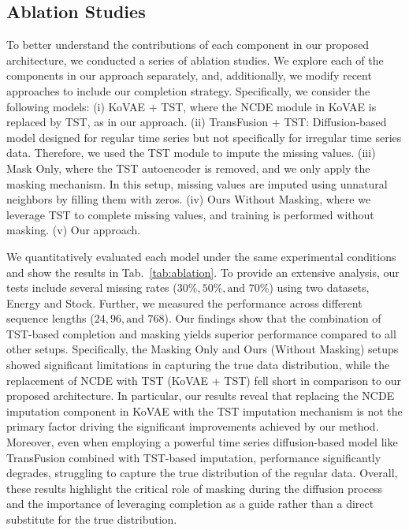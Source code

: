 \documentclass{article}
\theoremstyle{plain}
\theoremstyle{definition}
\theoremstyle{remark}
\begin{document}
\vspace{-2mm}
\subsection{Ablation Studies}
\label{subsec:ablation}
\vspace{-2mm}

To better understand the contributions of each component in our proposed architecture, we conducted a series of ablation studies. We explore each of the components in our approach separately, and, additionally, we modify recent approaches to include our completion strategy. Specifically, we consider the following models: (i) KoVAE + TST, where the NCDE module in KoVAE is replaced by TST, as in our approach. (ii) TransFusion \cite{sikder2023transfusion}
 + TST: Diffusion-based model designed for regular time series but not specifically for irregular time series data. Therefore, we used the TST module to impute the missing values. (iii) Mask Only, where the TST autoencoder is removed, and we only apply the masking mechanism. In this setup, missing values are imputed using unnatural neighbors by filling them with zeros. (iv) Ours Without Masking, where we leverage TST to complete missing values, and training is performed without masking. (v) Our approach.




We quantitatively evaluated each model under the same experimental conditions and show the results in Tab.~\ref{tab:ablation}. To provide an extensive analysis, our tests include several missing rates ($30\%, 50\%, \text{and } 70\%$) using two datasets, Energy and Stock. Further, we measured the performance across different sequence lengths ($24, 96, \text{and } 768$). Our findings show that the combination of TST-based completion and masking yields superior performance compared to all other setups. Specifically, the Masking Only and Ours (Without Masking) setups showed significant limitations in capturing the true data distribution, while the replacement of NCDE with TST (KoVAE + TST) fell short in comparison to our proposed architecture. In particular, our results reveal that replacing the NCDE imputation component in KoVAE with the TST imputation mechanism is not the primary factor driving the significant improvements achieved by our method. Moreover, even when employing a powerful time series diffusion-based model like TransFusion combined with TST-based
imputation, performance significantly degrades, struggling to capture the true distribution of the regular data. Overall, these results highlight the critical role of masking during the diffusion process and the importance of leveraging completion as a guide rather than a direct substitute for the true distribution. 
\end{document}
